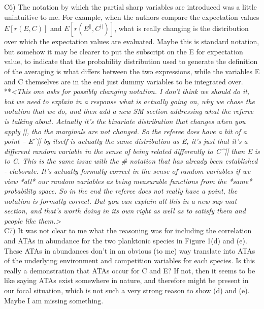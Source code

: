 \documentclass[letterpaper,11pt]{article}
\begin{document}
\noindent C6) The notation by which the partial sharp variables are introduced was a little unintuitive to me.  For example, when the authors compare the expectation values 
$E[r(E,C)]$ and $E[r(E^{||},C^{||})]$, what is really changing is the distribution over which the expectation values are evaluated.  Maybe this is standard notation, but somehow it may be clearer to put the subscript on the E for expectation value, to indicate that the probability distribution used to generate the definition of the averaging is what differs between the two expressions, while the variables E and C themselves are in the end just dummy variables to be integrated over.  \\

\noindent ***\emph{<This one asks for possibly changing notation. I don’t think we should do it, but we need to explain in a response what is actually going on, why we chose the notation that we do, and then add a new SM section addressing what the referee is talking about. Actually it’s the bivariate distribution that changes when you apply ||, tho the marginals are not changed. So the referee does have a bit of a point – E^{||} by itself is actually the same distribution as E, it’s just that it’s a different random variable in the sense of being related differently to C^{||} than E is to C. This is the same issue with the # notation that has already been established - elaborate. It’s actually formally correct in the sense of random variables if we view *all* our random variables as being measurable functions from the *same* probability space. So in the end the referee does not really have a point, the notation is formally correct. But you can explain all this in a new sup mat section, and that's worth doing in its own right as well as to satisfy them and people like them.>} \\

\noindent C7) It was not clear to me what the reasoning was for including the correlation and ATAs in abundance for the two planktonic species in Figure 1(d) and (e).  These ATAs in abundances don't in an obvious (to me) way translate into ATAs of the underlying environment and competition variables for each species. Is this really a demonstration that ATAs occur for C and E?  If not, then it seems to be like saying ATAs exist somewhere in nature, and therefore might be present in our focal situation, which is not such a very strong reason to show (d) and (e).  Maybe I am missing something. \\
\end{document}
